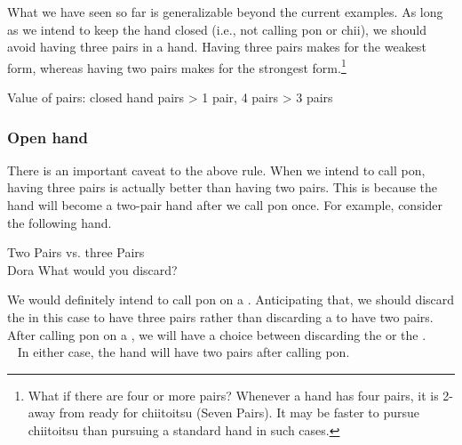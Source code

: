 \bigskip
What we have seen so far is generalizable beyond the current examples. As long as we intend to keep the hand closed (i.e., not calling {\jap pon} or {\jap chii}), we should avoid having three pairs in a hand. Having three pairs makes for the weakest form, whereas having two pairs makes for the strongest form.\footnote{What if there are four or more pairs? Whenever a hand has four pairs, it is 2-away from ready for {\jap chiitoitsu} (Seven Pairs). It may be faster to pursue {\jap chiitoitsu} than pursuing a standard hand in such cases.}

\bigskip

\begin{itembox}[c]{Value of pairs: closed hand}
 pairs > 1 pair, 4 pairs > 3 pairs
\end{itembox}

\bigskip

\subsubsection{Open hand}

There is an important caveat to the above rule. 
When we intend to call {\jap pon}, having three pairs is actually better than having two pairs. This is because the hand will become a two-pair hand after we call {\jap pon} once.
For example, consider the following hand. 
\begin{itembox}[r]{Two Pairs vs. three Pairs}
\bp
{}\zhong\zhong~\zhong\\
\hspace{310pt}\footnotesize{{\jap Dora}}
\ep
\vspace{-17pt}What would you discard? \vspace{-5pt}
\end{itembox}
\noindent
We would definitely intend to call {\jap pon} on a {\large\zhong}. Anticipating that, we should discard the {\large{}} in this case to have three pairs rather than discarding a {\large{}} to have two pairs. After calling {\jap pon} on a {\large\zhong}, we will have a choice between discarding the {\large{}} or the {\large{}}.
\bp
{}~\zhong\rzhong\zhong\\
~\zhong\rzhong\zhong
\ep
In either case, the hand will have two pairs after calling {\jap pon}. 

